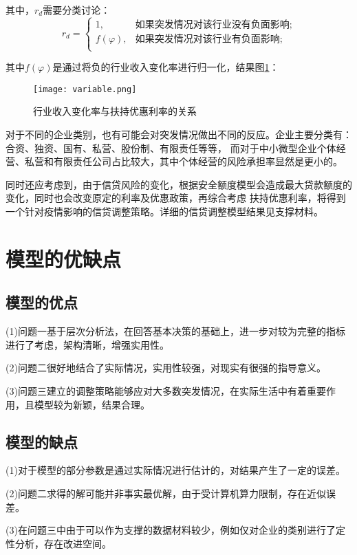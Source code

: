 \documentclass[withoutpreface,bwprint]{cumcmthesis}
\begin{document}
其中，$r_d$需要分类讨论：
\begin{equation}
    r_d = \begin{cases}
        1, &\text{如果突发情况对该行业没有负面影响};\\
        f(\varphi), &\text{如果突发情况对该行业有负面影响};\\
    \end{cases}
\end{equation}

其中$f(\varphi)$是通过将负的行业收入变化率进行归一化，结果图\ref{fig:variable}：
\begin{figure}[H]
    \centering
    \texttt{[image: variable.png]}
    \caption{行业收入变化率与扶持优惠利率的关系}
    \label{fig:variable}
\end{figure}

对于不同的企业类别，也有可能会对突发情况做出不同的反应。企业主要分类有：合资、独资、国有、私营、股份制、有限责任等等，
而对于中小微型企业个体经营、私营和有限责任公司占比较大，其中个体经营的风险承担率显然是更小的。

同时还应考虑到，由于信贷风险的变化，根据安全额度模型会造成最大贷款额度的变化，同时也会改变原定的利率及优惠政策，再综合考虑
扶持优惠利率，将得到一个针对疫情影响的信贷调整策略。详细的信贷调整模型结果见支撑材料。

\section{模型的优缺点}
\subsection{模型的优点}
(1)问题一基于层次分析法，在回答基本决策的基础上，进一步对较为完整的指标进行了考虑，架构清晰，增强实用性。

(2)问题二很好地结合了实际情况，实用性较强，对现实有很强的指导意义。

(3)问题三建立的调整策略能够应对大多数突发情况，在实际生活中有着重要作用，且模型较为新颖，结果合理。

\subsection{模型的缺点}
(1)对于模型的部分参数是通过实际情况进行估计的，对结果产生了一定的误差。

(2)问题二求得的解可能并非事实最优解，由于受计算机算力限制，存在近似误差。

(3)在问题三中由于可以作为支撑的数据材料较少，例如仅对企业的类别进行了定性分析，存在改进空间。
\end{document}
